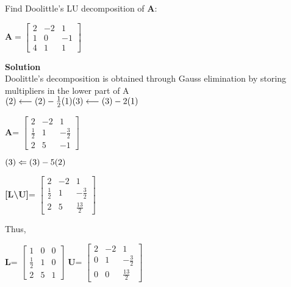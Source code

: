 \begin{exercise}{2} %
Find Doolittle's LU decomposition of \textbf{A}:\\
\begin{center}
$\textbf{A}= 
\begin{bmatrix}
2&-2&1\\1&0&-1\\4&1&1
\end{bmatrix}$
\end{center}
\textbf{Solution}\\
Doolittle's decomposition is obtained through Gauss elimination by storing multipliers in the lower part of A \\
$
(2) \longleftarrow (2) - \frac{1}{2} (1)\\
(3) \longleftarrow (3) - 2(1)\\
$
\begin{center}
\textbf{A}= 
$\begin{bmatrix}
2&-2&1\\ 
\boxed{\frac{1}{2}}&1&-\frac{3}{2}\\
\boxed{2}&5&-1
\end{bmatrix}
$ 
\end{center}
$(3) \Leftarrow (3) - 5(2)\\$
\begin{center}
\textbf{[L\textbackslash U]}= 
$\begin{bmatrix}
2&-2&1\\ 
\boxed{\frac{1}{2}}&1&-\frac{3}{2}\\
\boxed{2}&\boxed{5}&\frac{13}{2}
\end{bmatrix}
$ 
\end{center}
Thus,
\begin{center}
\textbf{L}= 
$\begin{bmatrix}
1&0&0\\ 
\frac{1}{2}&1&0\\
2&5&1
\end{bmatrix}
$ 
\textbf{U}= 
$\begin{bmatrix}
2&-2&1\\ 
0&1&-\frac{3}{2}\\
0&0&\frac{13}{2}
\end{bmatrix}
$ 
\end{center}
\end{exercise}

